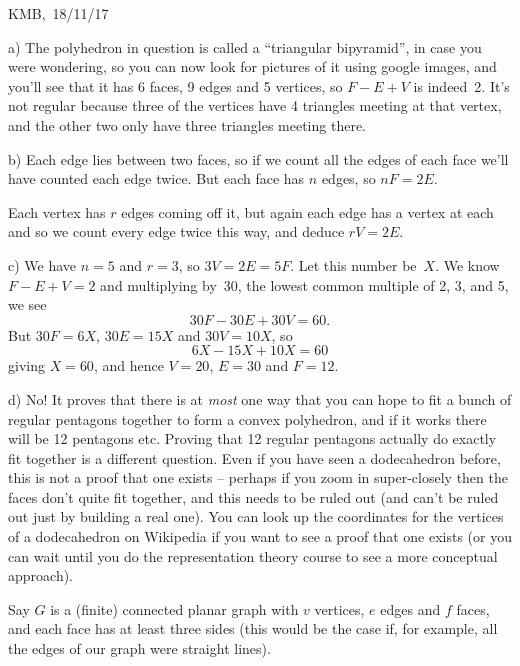 \documentclass[10pt]{article}
\begin{document}
\begin{flushright} KMB,\ 18/11/17\end{flushright}


\medskip{} 

a) The polyhedron in question is called a ``triangular bipyramid'', in case you were wondering, so you can now look for pictures of it using google images, and you'll see that it has 6 faces, 9 edges and 5 vertices, so $F-E+V$ is indeed~2. It's not regular because three of the vertices have 4 triangles meeting at that vertex, and the other two only have three triangles meeting there.

b) Each edge lies between two faces, so if we count all the edges of each face we'll have counted each edge twice. But each face has $n$ edges, so $nF=2E$.

Each vertex has $r$ edges coming off it, but again each edge has a vertex at each and so we count every edge twice this way, and deduce $rV=2E$.

c) We have $n=5$ and $r=3$, so $3V=2E=5F$. Let this number be~$X$. We know $F-E+V=2$ and multiplying by~30, the lowest common multiple of 2, 3, and 5, we see
$$30F-30E+30V=60.$$
But $30F=6X$, $30E=15X$ and $30V=10X$, so
$$6X-15X+10X=60$$
giving $X=60$, and hence $V=20$, $E=30$ and $F=12$.

d) No! It proves that there is at \emph{most} one way that you can hope to fit a bunch of regular pentagons together to form a convex polyhedron, and if it works there will be 12 pentagons etc. Proving that 12 regular pentagons actually do exactly fit together is a different question. Even if you have seen a dodecahedron before, this is not a proof that one exists -- perhaps if you zoom in super-closely then the faces don't quite fit together, and this needs to be ruled out (and can't be ruled out just by building a real one). You can look up the coordinates for the vertices of a dodecahedron on Wikipedia if you want to see a proof that one exists (or you can wait until you do the representation theory course to see a more conceptual approach).

\medskip{} 

Say $G$ is a (finite) connected planar graph with $v$ vertices, $e$ edges and $f$ faces, and each face has at least three sides (this would be the case if, for example, all the edges of our graph were straight lines). 
\end{document}
